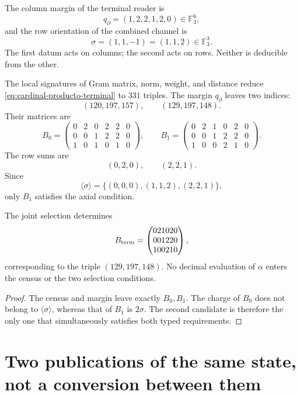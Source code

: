 The column margin of the terminal reader is
\[
 q_\partial=(1,2,2,1,2,0)\in\mathbb F_3^6,
\]
and the row orientation of the combined channel is
\[
 \sigma=(1,1,-1)=(1,1,2)\in\mathbb F_3^3.
\]
The first datum acts on columns; the second acts on rows. Neither is deducible from the other.

The local signatures of Gram matrix, norm, weight, and distance reduce
\eqref{eq:cardinal-producto-terminal} to \(331\) triples. The margin
\(q_\partial\) leaves two indices:
\[
 (120,197,157),
 \qquad
 (129,197,148).
\]
Their matrices are
\[
 B_0=
 \begin{pmatrix}
 0&2&0&2&2&0\\
 0&0&1&2&2&0\\
 1&0&1&0&1&0
 \end{pmatrix},
 \qquad
 B_1=
 \begin{pmatrix}
 0&2&1&0&2&0\\
 0&0&1&2&2&0\\
 1&0&0&2&1&0
 \end{pmatrix}.
\]
The row sums are
\[
 (0,2,0),
 \qquad
 (2,2,1).
\]
Since
\[
 \langle\sigma\rangle
 =\{(0,0,0),(1,1,2),(2,2,1)\},
\]
only \(B_1\) satisfies the axial condition.

\begin{theorem}
\label{thm:unicidad-publicacion-terminal-visible}
The joint selection determines
\begin{equation}
 B_{\rm term}=
 \begin{pmatrix}
 021020\\001220\\100210
 \end{pmatrix},
 \label{eq:matriz-terminal-visible}
\end{equation}
corresponding to the triple \((129,197,148)\). No decimal evaluation of
\(\alpha\) enters the census or the two selection conditions.
\end{theorem}

\begin{proof}
The census and margin leave exactly \(B_0,B_1\). The charge of \(B_0\)
does not belong to \(\langle\sigma\rangle\), whereas that of \(B_1\) is
\(2\sigma\). The second candidate is therefore the only one that simultaneously satisfies
both typed requirements.
\end{proof}

\section{Two publications of the same state, not a conversion between them}

